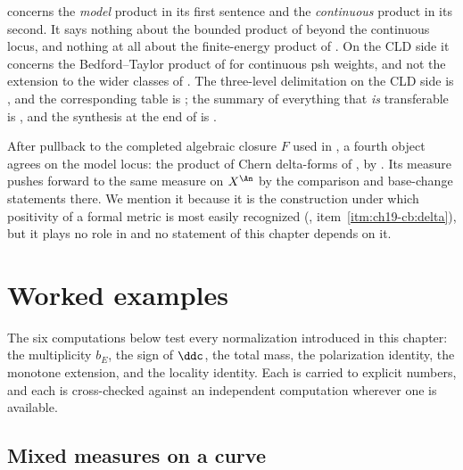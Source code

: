 \begin{remark}
\label{rem:ch24-which-product}
 concerns the \emph{model} product in its
first sentence and the \emph{continuous} product in its second.  It says
nothing about the bounded product of  beyond
the continuous locus, and nothing at all about the finite-energy product of
.  On the CLD side it concerns the Bedford--Taylor
product of  for continuous psh weights, and not the
extension to the wider classes of .  The
three-level delimitation on the CLD side is
, and the corresponding table is
; the summary of everything that
\emph{is} transferable is , and the synthesis at the
end of  is
.
\end{remark}

\begin{remark}
\label{rem:ch24-delta-forms}
After pullback to the completed algebraic closure $F$ used in
, a fourth object agrees on the model
locus: the product of Chern delta-forms of , by
.  Its measure pushes forward to the same
measure on $X^{\An}$ by the comparison and base-change statements there.  We mention it because it is the
construction under which positivity of a formal metric is most easily
recognized (,
item~\cref{itm:ch19-cb:delta}), but it plays no role in
 and no statement of this chapter depends on it.
\end{remark}

\section{Worked examples}
\label{sec:ch24-examples}

The six computations below test every normalization introduced in this
chapter: the multiplicity $b_E$, the sign of $\ddc$, the total mass, the
polarization identity, the monotone extension, and the locality identity.
Each is carried to explicit numbers, and each is cross-checked against an
independent computation wherever one is available.

\subsection{Mixed measures on a curve}
\label{sec:ch24-ex-curve}

